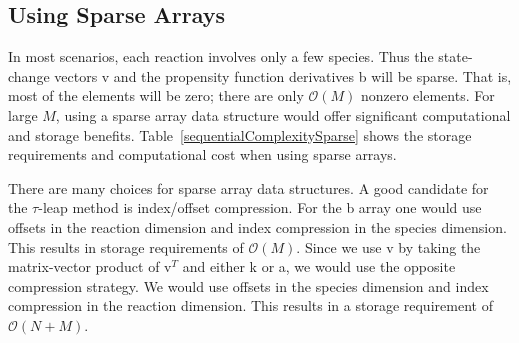 \documentclass[letterpaper]{article}
\begin{document}
\subsection{Using Sparse Arrays}


In most scenarios, each reaction involves only a few species.  Thus the 
state-change vectors v and the propensity function derivatives b will
be sparse.  That is, most of the elements will be 
zero; there are only $\mathcal{O}(M)$ nonzero elements.  For large $M$,
using a sparse array data structure would offer significant computational
and storage benefits.  Table~\ref{sequentialComplexitySparse} shows
the storage requirements and computational cost when using sparse arrays.

There are many choices for sparse array data structures.  A good candidate
for the $\tau$-leap method is index/offset compression.  
For the b
array one would use offsets in the reaction dimension and index compression
in the species dimension.  This results in storage requirements of
$\mathcal{O}(M)$.  Since we use v by taking the matrix-vector product of
$\mathrm{v}^T$ and either k or a, we would use the opposite compression 
strategy.  We would use offsets in the species dimension and index
compression in the reaction dimension.  This results in a storage requirement 
of $\mathcal{O}(N + M)$.  
\end{document}
